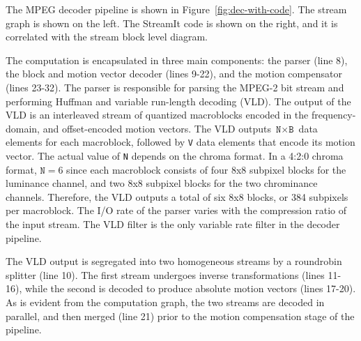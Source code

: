 
The MPEG decoder pipeline is shown in
Figure~\ref{fig:dec-with-code}. The stream graph is shown on the
left. The StreamIt code is shown on the right, and it is correlated
with the stream block level diagram.

The computation is encapsulated in three main components: the parser
(line 8), the block and motion vector decoder (lines 9-22), and the
motion compensator (lines 23-32).  The parser is responsible for
parsing the MPEG-2 bit stream and performing Huffman and variable
run-length decoding (VLD). The output of the VLD is an interleaved
stream of quantized macroblocks encoded in the frequency-domain, and
offset-encoded motion vectors. The VLD outputs
$\texttt{N}\times\texttt{B}$ data elements for each macroblock,
followed by \texttt{V} data elements that encode its motion
vector. The actual value of \texttt{N} depends on the chroma
format. In a 4:2:0 chroma format, $\texttt{N}=6$ since each
macroblock consists of four 8x8 subpixel blocks for the luminance
channel, and two 8x8 subpixel blocks for the two chrominance
channels. Therefore, the VLD outputs a total of six 8x8 blocks, or 384
subpixels per macroblock.  The I/O rate of the parser varies with the
compression ratio of the input stream. The VLD filter is the only
variable rate filter in the decoder pipeline.

The VLD output is segregated into two homogeneous streams by a
roundrobin splitter (line 10). The first stream undergoes inverse
transformations (lines 11-16), while the second is decoded to produce
absolute motion vectors (lines 17-20). As is evident from the computation
graph, the two streams are decoded in parallel, and then merged (line
21) prior to the motion compensation stage of the pipeline.

